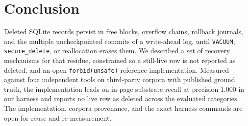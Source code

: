 \documentclass[10pt,a4paper]{article}
\newcommand{\code}[1]{\texttt{#1}}
\begin{document}
\section{Conclusion}\label{sec:conclusion}

Deleted SQLite records persist in free blocks, overflow chains, rollback journals,
and the multiple uncheckpointed commits of a write-ahead log, until \code{VACUUM},
\code{secure\_delete}, or reallocation erases them. We described a set of recovery
mechanisms for that residue, constrained so a still-live row is not reported as
deleted, and an open \code{forbid(unsafe)} reference implementation. Measured against
four independent tools on third-party corpora with published ground truth, the
implementation leads on in-page substrate recall at precision $1.000$ in our harness
and reports no live row as deleted across the evaluated categories. The
implementation, corpora provenance, and the exact harness commands are open for
reuse and re-measurement.



\end{document}
